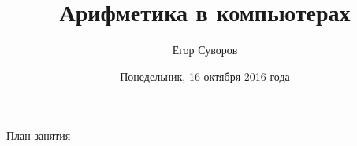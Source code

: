 \documentclass[utf8,xcolor=table]{beamer}
\title{Арифметика в компьютерах}
\author{Егор Суворов}
\institute[СПб АУ]{Курс <<Парадигмы и языки программирования>>, подгруппа 3}
\date[17.10.2016]{Понедельник, 16 октября 2016 года}
\begin{document}
\begin{frame}
\titlepage
\end{frame}

\begin{frame}{План занятия}
	\tableofcontents
\end{frame}










\end{document}
